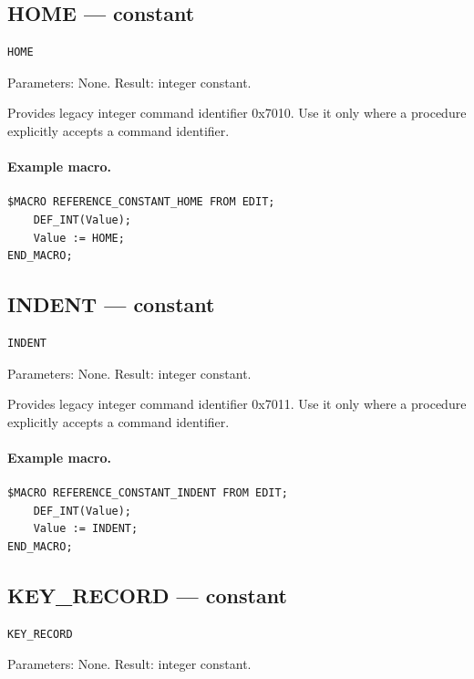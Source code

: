 \documentclass[a4paper,10pt,twoside,openany]{book}
\begin{document}
\label{prim:constant-home}
\subsection*{HOME --- constant}
\begin{verbatim}
HOME
\end{verbatim}
Parameters: None. Result: integer constant.

Provides legacy integer command identifier 0x7010. Use it only where a procedure explicitly accepts a command identifier.

\paragraph{Example macro.}
\begin{verbatim}
$MACRO REFERENCE_CONSTANT_HOME FROM EDIT;
    DEF_INT(Value);
    Value := HOME;
END_MACRO;
\end{verbatim}

\label{prim:constant-indent}
\subsection*{INDENT --- constant}
\begin{verbatim}
INDENT
\end{verbatim}
Parameters: None. Result: integer constant.

Provides legacy integer command identifier 0x7011. Use it only where a procedure explicitly accepts a command identifier.

\paragraph{Example macro.}
\begin{verbatim}
$MACRO REFERENCE_CONSTANT_INDENT FROM EDIT;
    DEF_INT(Value);
    Value := INDENT;
END_MACRO;
\end{verbatim}

\label{prim:constant-key-record}
\subsection*{KEY\_RECORD --- constant}
\begin{verbatim}
KEY_RECORD
\end{verbatim}
Parameters: None. Result: integer constant.
\end{document}

